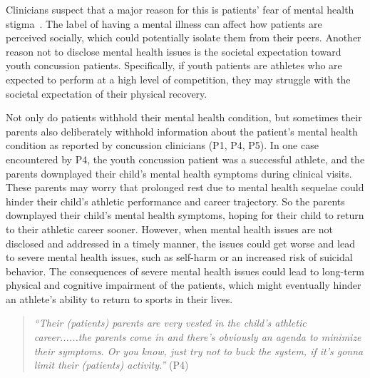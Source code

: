 Clinicians suspect that a major reason for this is patients' fear of mental health stigma~\cite{apa_stigma}.
The label of having a mental illness can affect how patients are perceived socially, which could potentially isolate them from their peers.
Another reason not to disclose mental health issues is the societal expectation toward youth concussion patients.
Specifically, if youth patients are athletes who are expected to perform at a high level of competition, they may struggle with the societal expectation of their physical recovery. 

Not only do patients withhold their mental health condition, but sometimes their parents also deliberately withhold information about the patient's mental health condition as reported by concussion clinicians (P1, P4, P5).
In one case encountered by P4, the youth concussion patient was a successful athlete, and the parents downplayed their child’s mental health symptoms during clinical visits. 
These parents may worry that prolonged rest due to mental health sequelae could hinder their child’s athletic performance and career trajectory. 
So the parents downplayed their child’s mental health symptoms, hoping for their child to return to their athletic career sooner.
However, when mental health issues are not disclosed and addressed in a timely manner, the issues could get worse and lead to severe mental health issues, such as self-harm or an increased risk of suicidal behavior.
The consequences of severe mental health issues could lead to long-term physical and cognitive impairment of the patients, which might eventually hinder an athlete's ability to return to sports in their lives.
\begin{quote}
    \textit{``Their (patients) parents are very vested in the child's athletic career......the parents come in and there's obviously an agenda to minimize their symptoms. Or you know, just try not to buck the system, if it's gonna limit their (patients) activity.''} (P4)
\end{quote}


